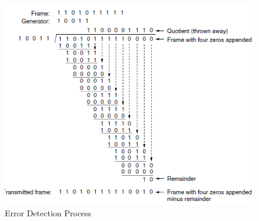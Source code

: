 \begin{figure}[!htbp]
	\centering
	\includegraphics [scale=0.55]{images/Intro/Imagen2.png}
	\caption{Error Detection Process}
\end{figure} 
